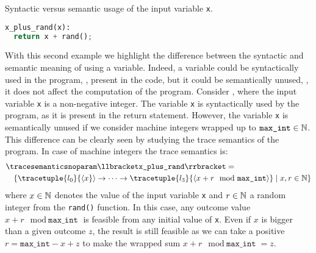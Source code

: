 \begin{example}
  \begin{marginlisting}
    \caption{Syntactic versus semantic usage of the input variable \texttt{x}.}
    \vspace{2\lineheight}
  \begin{lstlisting}[language=Python]
x_plus_rand(x):
  return x + rand();
 \end{lstlisting}
  \end{marginlisting}
With this second example we highlight the difference between the syntactic and semantic meaning of using a variable. Indeed, a variable could be syntactically used in the program, \ie, present in the code, but it could be semantically unused, \ie, it does not affect the computation of the program.
Consider , where the input variable \texttt{x} is a non-negative integer.
The variable \texttt{x} is syntactically used by the program, as it is present in the return statement.
However, the variable \texttt{x} is semantically unused if we consider machine integers wrapped up to $\texttt{max\_int}\in\mathbb{N}$.
This difference can be clearly seen by studying the trace semantics of the program. In case of machine integers the trace semantics is:
\begin{align*}
  &\tracesemanticsnoparam\semanticsof{\texttt{x\_plus\_rand}}
  =\\
  &\quad\setdef{
    \tracetuple{\locinit}{\langle{x}}\rangle\tracearrow\tracetuple{\loc{3}}{\langle{x+r \mod \texttt{max\_int}}\rangle}
  }{x, r \in \N}
\end{align*}
where $x\in\mathbb{N}$ denotes the value of the input variable \texttt{x} and $r\in\mathbb{N}$ a random integer from the \texttt{rand()} function.
In this case, any outcome value $x+r \mod \texttt{max\_int}$ is feasible from any initial value of \texttt{x}.
Even if $x$ is bigger than a given outcome $z$, the result is still feasible as we can take a positive $r = \texttt{max\_int} - x + z$ to make the wrapped sum $x + r \mod \texttt{max\_int} = z$.


\end{example}
